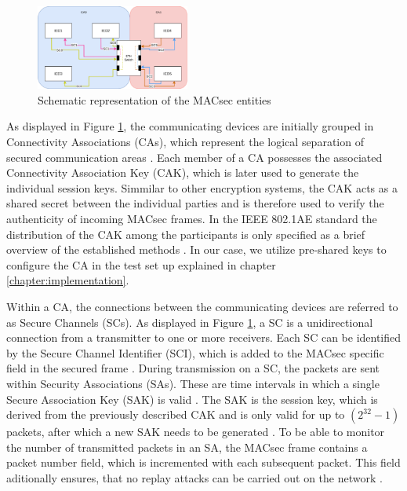 \documentclass[conference, onecolumn, a4paper]{IEEEtran}
\begin{document}
\begin{figure}[h]
    \centering
    \includegraphics[width=0.45\textwidth]{images/MACsec_Entities_Diagram.png}
    \caption{Schematic representation of the MACsec entities \cite{IEEE-802-1AE:2018}}
    \label{image:MACsecEntities}
\end{figure}

\noindent As displayed in Figure \ref{image:MACsecEntities}, the communicating devices are initially grouped in Connectivity Associations (CAs), which 
represent the logical separation of secured communication areas \cite[p. 35]{IEEE-802-1AE:2018}. Each member of a CA possesses the associated Connectivity 
Association Key (CAK), which is later used to generate the individual session keys. Simmilar to other encryption systems, the CAK acts as a shared 
secret between the individual parties and is therefore used to verify the authenticity of incoming MACsec frames. In the IEEE 802.1AE standard the 
distribution of the CAK among the participants is only specified as a brief overview of the established methods \cite[p. 230]{IEEE-802-1AE:2018}. 
In our case, we utilize pre-shared keys to configure the CA in the test set up explained in chapter \ref{chapter:implementation}.

\smallskip
Within a CA, the connections between the communicating devices are referred to as Secure Channels (SCs). As displayed in Figure \ref{image:MACsecEntities}, 
a SC is a unidirectional connection from a transmitter to one or more receivers. Each SC can be identified by the Secure Channel Identifier (SCI), 
which is added to the MACsec specific field in the secured frame \cite[p. 43]{IEEE-802-1AE:2018}. During transmission on a SC, the packets are sent 
within Security Associations (SAs). These are time intervals in which a single Secure Association Key (SAK) is valid \cite[p. 44]{IEEE-802-1AE:2018}. 
The SAK is the session key, which is derived from the previously described CAK and is only valid for up to ${(2^{32} -1)}$ packets, after which a new 
SAK needs to be generated \cite[p. 66]{IEEE-802-1AE:2018}. To be able to monitor the number of transmitted packets in an SA, the MACsec frame contains 
a packet number field, which is incremented with each subsequent packet. This field aditionally ensures, that no replay attacks can be carried out on 
the network \cite[p. 145]{IEEE-802-1AE:2018}. 
\end{document}
